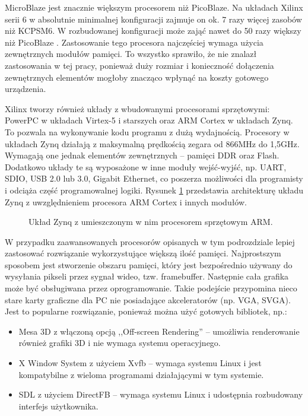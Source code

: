 MicroBlaze jest znacznie większym procesorem niż PicoBlaze. Na układach Xilinx serii 6 w absolutnie minimalnej konfiguracji zajmuje on ok. 7 razy więcej zasobów niż KCPSM6. W rozbudowanej konfiguracji może zająć nawet do 50 razy większy niż PicoBlaze \cite{MicroBlaze_WWW}. Zastosowanie tego procesora najczęściej wymaga użycia zewnętrznych modułów pamięci. To wszystko sprawiło, że nie znalazł zastosowania w tej pracy, ponieważ duży rozmiar i konieczność dołączenia zewnętrznych elementów mogłoby znacząco wpłynąć na koszty gotowego urządzenia.


Xilinx tworzy również układy z wbudowanymi procesorami sprzętowymi: PowerPC w układach Virtex-5 i starszych oraz ARM Cortex w układach Zynq. To pozwala na wykonywanie kodu programu z dużą wydajnością. Procesory w układach Zynq działają z maksymalną prędkością zegara od 866MHz do 1,5GHz. Wymagają one jednak elementów zewnętrznych -- pamięci DDR oraz Flash. Dodatkowo układy te są wyposażone w inne moduły wejść-wyjść, np. UART, SDIO, USB 2.0 lub 3.0, Gigabit Ethernet, co poszerza możliwości dla programisty i odciąża część programowalnej logiki. Rysunek \ref{Zynq} przedstawia architekturę układu Zynq z uwzględnieniem procesora ARM Cortex i innych modułów.


\begin{figure}[htb]
	\centering
	\caption{ Układ Zynq z umieszczonym w nim procesorem sprzętowym ARM. \cite{Zynq_ahead} }
	\label{Zynq}
\end{figure}


W przypadku zaawansowanych procesorów opisanych w tym podrozdziale lepiej zastosować rozwiązanie wykorzystujące większą ilość pamięci. Najprostszym sposobem jest stworzenie obszaru pamięci, który jest bezpośrednio używany do wysyłania pikseli przez sygnał wideo, tzw. framebuffer. Następnie cała grafika może być obsługiwana przez oprogramowanie. Takie podejście przypomina nieco stare karty graficzne dla PC nie posiadające akceleratorów (np. VGA, SVGA). Jest to popularne rozwiązanie, ponieważ można użyć gotowych bibliotek, np.:


\begin{itemize}
	\item		Mesa 3D z włączoną opcją ,,Off-screen Rendering'' \cite{mesa3d} -- umożliwia renderowanie również grafiki 3D i nie wymaga systemu operacyjnego.
	\item		X Window System z użyciem Xvfb \cite{Xvfb} -- wymaga systemu Linux i jest kompatybilne z wieloma programami działającymi w tym systemie.
	\item		SDL z użyciem DirectFB \cite{xilinxHmi} \cite{DirectFB} -- wymaga systemu Linux i udostępnia rozbudowany interfejs użytkownika.
\end{itemize}


